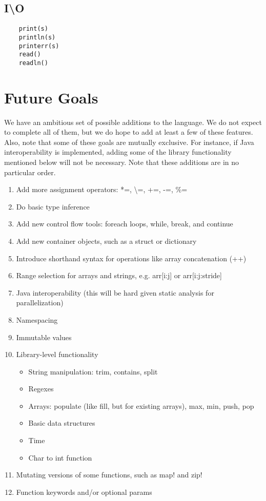 \documentclass[11pt]{article}
\begin{document}
\subsection{I\textbackslash O}
\begin{verbatim}
    print(s)
    println(s)
    printerr(s)
    read()
    readln()
\end{verbatim}

\section{Future Goals}
We have an ambitious set of possible additions to the language. We do not expect to complete all of them, but we do hope to add at least a few of these features. Also, note that some of these goals are mutually exclusive. For instance, if Java interoperability is implemented, adding some of the library functionality mentioned below will not be necessary. Note that these additions are in no particular order.

\begin{enumerate}
\item
Add more assignment operators: *=, \textbackslash=, +=, -=, \%=
\item
Do basic type inference
\item
Add new control flow tools: foreach loops, while, break, and continue
\item
Add new container objects, such as a struct or dictionary
\item
Introduce shorthand syntax for operations like array concatenation (++)
\item
Range selection for arrays and strings, e.g. arr[i:j] or arr[i:j:stride]
\item
Java interoperability (this will be hard given static analysis for parallelization)
\item
Namespacing
\item
Immutable values
\item
Library-level functionality
\begin{itemize}
\item
String manipulation: trim, contains, split
\item
Regexes
\item
Arrays: populate (like fill, but for existing arrays), max, min, push, pop
\item
Basic data structures
\item
Time
\item
Char to int function
\end{itemize}
\item
Mutating versions of some functions, such as map! and zip!
\item
Function keywords and/or optional params
\end{enumerate}
\end{document}
